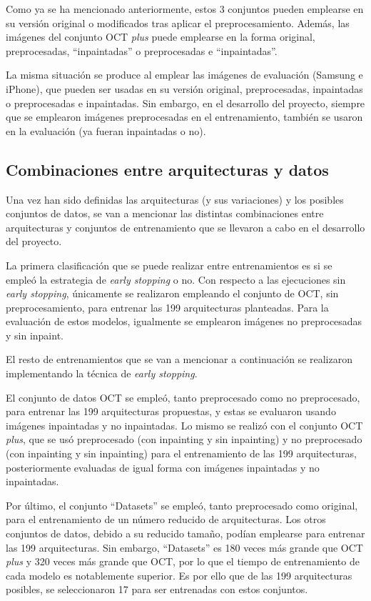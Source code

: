 Como ya se ha mencionado anteriormente, estos 3 conjuntos pueden emplearse en su versión original o modificados tras aplicar el preprocesamiento. Además, las imágenes del conjunto OCT \textit{plus} puede emplearse en la forma original, preprocesadas, ``inpaintadas'' o preprocesadas e ``inpaintadas''.

La misma situación se produce al emplear las imágenes de evaluación (Samsung e iPhone), que pueden ser usadas en su versión original, preprocesadas, inpaintadas o preprocesadas e inpaintadas. Sin embargo, en el desarrollo del proyecto, siempre que se emplearon imágenes preprocesadas en el entrenamiento, también se usaron en la evaluación (ya fueran inpaintadas o no).

\subsection{Combinaciones entre arquitecturas y datos}

Una vez han sido definidas las arquitecturas (y sus variaciones) y los posibles conjuntos de datos, se van a mencionar las distintas combinaciones entre arquitecturas y conjuntos de entrenamiento que se llevaron a cabo en el desarrollo del proyecto.

La primera clasificación que se puede realizar entre entrenamientos es si se empleó la estrategia de \textit{early stopping} o no. Con respecto a las ejecuciones sin \textit{early stopping}, únicamente se realizaron empleando el conjunto de OCT, sin preprocesamiento, para entrenar las 199 arquitecturas planteadas. Para la evaluación de estos modelos, igualmente se emplearon imágenes no preprocesadas y sin inpaint.

El resto de entrenamientos que se van a mencionar a continuación se realizaron implementando la técnica de \textit{early stopping}.

El conjunto de datos OCT se empleó, tanto preprocesado como no preprocesado, para entrenar las 199 arquitecturas propuestas, y estas se evaluaron usando imágenes inpaintadas y no inpaintadas. Lo mismo se realizó con el conjunto OCT \textit{plus}, que se usó preprocesado (con inpainting y sin inpainting) y no preprocesado (con inpainting y sin inpainting) para el entrenamiento de las 199 arquitecturas, posteriormente evaluadas de igual forma con imágenes inpaintadas y no inpaintadas.

Por último, el conjunto ``Datasets'' se empleó, tanto preprocesado como original, para el entrenamiento de un número reducido de arquitecturas. Los otros conjuntos de datos, debido a su reducido tamaño, podían emplearse para entrenar las 199 arquitecturas. Sin embargo, ``Datasets'' es 180 veces más grande que OCT \textit{plus} y 320 veces más grande que OCT, por lo que el tiempo de entrenamiento de cada modelo es notablemente superior. Es por ello que de las 199 arquitecturas posibles, se seleccionaron 17 para ser entrenadas con estos conjuntos.

